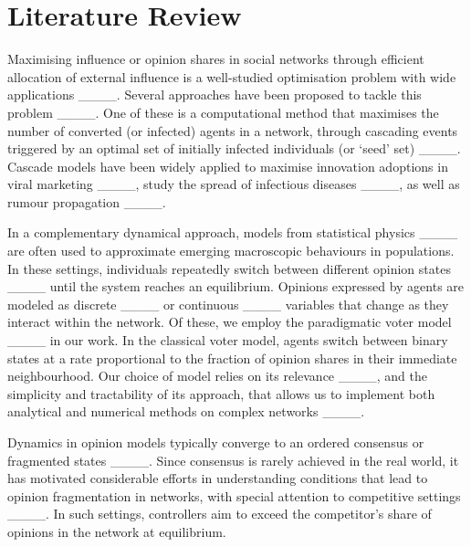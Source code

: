 \section{Literature Review}
\label{background}
Maximising influence or opinion shares in social networks through efficient allocation of external influence is a well-studied optimisation problem with wide applications ____. Several approaches have been proposed to tackle this problem ____. One of these is a computational method that maximises the number of converted (or infected) agents in a network, through cascading events triggered by an optimal set of initially infected individuals (or `seed' set) ____. Cascade models have been widely applied to maximise innovation adoptions in viral marketing ____, study the spread of infectious diseases ____, as well as rumour propagation ____. 

In a complementary dynamical approach, models from statistical physics ____ are often used to approximate emerging macroscopic behaviours in populations. In these settings, individuals repeatedly switch between different opinion states ____ until the system reaches an equilibrium. Opinions expressed by agents are modeled as discrete ____ or continuous ____ variables that change as they interact within the network. Of these, we employ the paradigmatic voter model ____ in our work. In the classical voter model, agents switch between binary states at a rate proportional to the fraction of opinion shares in their immediate neighbourhood. Our choice of model relies on its relevance ____, and the simplicity and tractability of its approach, that allows us to implement both analytical and numerical methods on complex networks ____.

Dynamics in opinion models typically converge to an ordered consensus or fragmented states ____. Since consensus is rarely achieved in the real world, it has motivated considerable efforts in understanding conditions that lead to opinion fragmentation in networks, with special attention to competitive settings ____. In such settings, controllers aim to exceed the competitor's share of opinions in the network at equilibrium.

